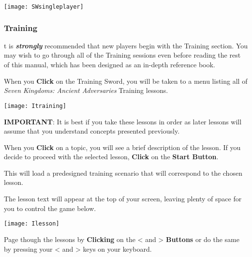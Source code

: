 \begin{center}
    \texttt{[image: SWsingleplayer]}
\end{center}

\subsubsection{Training}



t is \textbf{\textit{strongly}} recommended that new players begin with the Training section. You may wish to go through all of the Training sessions even before reading the rest of this manual, which has been designed as an in-depth reference book.

When you \textbf{Click} on the Training Sword, you will be taken to a menu listing all of \textit{Seven Kingdoms: Ancient Adversaries} Training lessons.


\begin{center}
    \texttt{[image: Itraining]} %
\end{center}


\textbf{IMPORTANT}: It is best if you take these lessons in order as later lessons will assume that you understand concepts presented previously.

When you \textbf{Click} on a topic, you will see a brief description of the lesson. If you decide to proceed with the selected lesson, \textbf{Click} on the \textbf{Start Button}.

This will load a predesigned training scenario that will correspond to the chosen lesson.

The lesson text will appear at the top of your screen, leaving plenty of space for you to control the game below.

\begin{center}
    \texttt{[image: Ilesson]} %
\end{center}


Page though the lessons by \textbf{Clicking} on the \textless \hspace{1pt} and \textgreater \hspace{1pt} \textbf{Buttons} or do the same by pressing your \textless \hspace{1pt} and \textgreater \hspace{1pt} keys on your keyboard.

